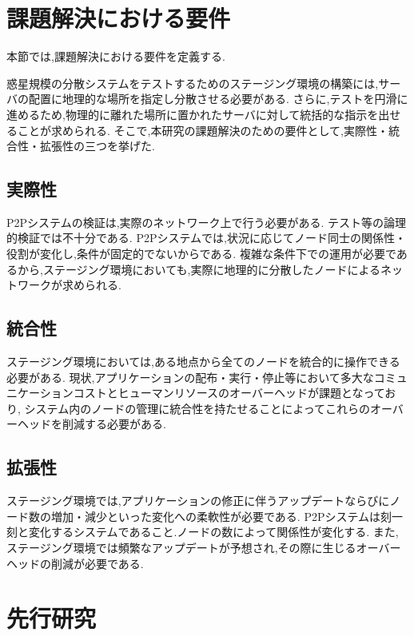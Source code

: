 \section{課題解決における要件}
\label{issue:requirements}

本節では,課題解決における要件を定義する.

惑星規模の分散システムをテストするためのステージング環境の構築には,サーバの配置に地理的な場所を指定し分散させる必要がある.
さらに,テストを円滑に進めるため,物理的に離れた場所に置かれたサーバに対して統括的な指示を出せることが求められる.
そこで,本研究の課題解決のための要件として,実際性・統合性・拡張性の三つを挙げた.

\subsection{実際性}
\label{issue:requirements1}

P2Pシステムの検証は,実際のネットワーク上で行う必要がある.
テスト等の論理的検証では不十分である.
P2Pシステムでは,状況に応じてノード同士の関係性・役割が変化し,条件が固定的でないからである.
複雑な条件下での運用が必要であるから,ステージング環境においても,実際に地理的に分散したノードによるネットワークが求められる.

\subsection{統合性}
\label{issue:requirements2}

ステージング環境においては,ある地点から全てのノードを統合的に操作できる必要がある.
現状,アプリケーションの配布・実行・停止等において多大なコミュニケーションコストとヒューマンリソースのオーバーヘッドが課題となっており,
システム内のノードの管理に統合性を持たせることによってこれらのオーバーヘッドを削減する必要がある.

\subsection{拡張性}
\label{issue:requirements3}

ステージング環境では,アプリケーションの修正に伴うアップデートならびにノード数の増加・減少といった変化への柔軟性が必要である.
P2Pシステムは刻一刻と変化するシステムであること.ノードの数によって関係性が変化する.
また,ステージング環境では頻繁なアップデートが予想され,その際に生じるオーバーヘッドの削減が必要である.

\section{先行研究}
\label{issue:previous-research}

